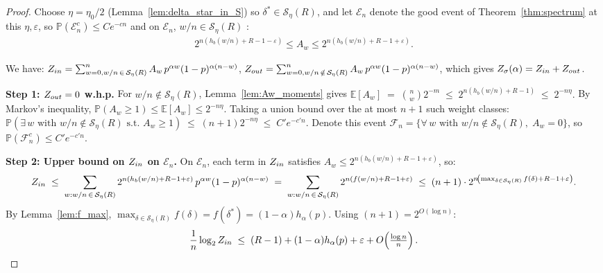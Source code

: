\documentclass[10pt,a4paper]{amsart}
\newcommand{\Eb}{\mathbb{E}}
\newcommand{\Hb}{h_b}
\newcommand{\Pb}{\mathbb{P}}
\newcommand{\Seta}{\mathcal{S}}
\begin{document}
\begin{proof}
Choose $\eta=\eta_0/2$ (Lemma~\ref{lem:delta_star_in_S}) so
$\delta^*\in\Seta_\eta(R)$, and let $\mathcal{E}_n$ denote the
good event of Theorem~\ref{thm:spectrum} at this $\eta,\varepsilon$,
so $\Pb(\mathcal{E}_n^c)\le Ce^{-cn}$ and on $\mathcal{E}_n$, \(w/n\in\Seta_\eta(R)\) :
\begin{align}
    2^{n(\Hb(w/n)+R-1-\varepsilon)}\le A_w\le
    2^{n(\Hb(w/n)+R-1+\varepsilon)}.
    \label{eq:spectrum_event}
\end{align}

We have: 
\(Z_{\rm in}=\sum_{\substack{w=0, w/n\,\in\,\Seta_\eta(R)}}^n
        A_w\,p^{\alpha w}(1-p)^{\alpha(n-w)}\),
 \(Z_{\rm out}=\sum_{\substack{w=0, w/n\,\notin\,\Seta_\eta(R)}}^n
        A_w\,p^{\alpha w}(1-p)^{\alpha(n-w)}\), which gives
\(Z_\sigma(\alpha)=Z_{\rm in}+Z_{\rm out}\).

 
\noindent\textbf{Step 1: $Z_{\rm out}=0$ w.h.p.}
For $w/n\notin\Seta_\eta(R)$, Lemma~\ref{lem:Aw_moments} gives
\(
    \Eb[A_w]
    \;=\;
    \binom{n}{w}2^{-m}
    \;\le\;
    2^{n(\Hb(w/n)+R-1)}
    \;\le\;
    2^{-n\eta}.
\)
By Markov's inequality, $\Pb(A_w\ge 1)\le\Eb[A_w]\le 2^{-n\eta}$.
Taking a union bound over the at most $n+1$ such weight classes:
\(
    \Pb\!\left(\exists\,w\text{ with }w/n\notin\Seta_\eta(R)
    \text{ s.t.\ }A_w\ge 1\right)
    \;\le\;
    (n+1)2^{-n\eta}
    \;\le\;
    C'e^{-c'n}.
\)
Denote this event
$\mathcal{F}_n=\{\forall\, w \text{ with }
w/n\notin\Seta_\eta(R),\; A_w=0\}$,
so $\Pb(\mathcal{F}_n^c)\le C'e^{-c'n}$.
 
\noindent\textbf{Step 2: Upper bound on $Z_{\rm in}$ on $\mathcal{E}_n$.}
On $\mathcal{E}_n$, each term in $Z_{\rm in}$ satisfies
$A_w\le 2^{n(\Hb(w/n)+R-1+\varepsilon)}$, so:
\[
    Z_{\rm in}
    \;\le\;
    \sum_{\substack{w:w/n\,\in\,\Seta_\eta(R)}}
    2^{n(\Hb(w/n)+R-1+\varepsilon)}\,p^{\alpha w}(1-p)^{\alpha(n-w)}
    \;=\;
    \sum_{\substack{w:w/n\,\in\,\Seta_\eta(R)}}
    2^{n(f(w/n)+R-1+\varepsilon)} 
    \;\le\;
    (n+1)\cdot
    2^{n\!\left(\max_{\delta\in\Seta_\eta(R)}f(\delta)+R-1+\varepsilon\right)}.
\]
By Lemma~\ref{lem:f_max},
$\max_{\delta\in\Seta_\eta(R)}f(\delta)=f(\delta^*)=(1-\alpha)h_\alpha(p)$.
Using $(n+1)=2^{O(\log n)}$:
\begin{equation}
    \frac{1}{n}\log_2 Z_{\rm in}
    \;\le\;
    (R-1)+(1-\alpha)h_\alpha(p)+\varepsilon+O\!\left(\tfrac{\log n}{n}\right).
    \label{eq:upper_final}
\end{equation}


\end{proof}
\end{document}
